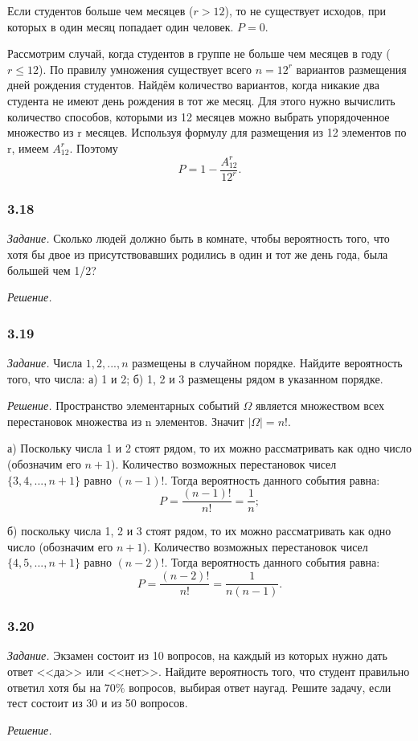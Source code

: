 \documentclass{book}
\begin{document}
Если студентов больше чем месяцев ($r>12$), то не существует исходов, при которых в один месяц попадает один человек. $P=0$.

Рассмотрим случай, когда студентов в группе не больше чем месяцев в году ($r\leq 12$). По правилу умножения существует всего $n=12^r$ вариантов размещения дней рождения студентов. Найдём количество вариантов, когда никакие два студента не имеют день рождения в тот же месяц. Для этого нужно вычислить количество способов, которыми из 12 месяцев можно выбрать упорядоченное множество из r месяцев. Используя формулу для размещения из 12 элементов по r, имеем $A_{12}^r$. Поэтому $$P=1-\frac{A_{12}^r}{12^r}.$$

\subsubsection*{3.18}

\textit{Задание.} Сколько людей должно быть в комнате, чтобы вероятность того, что хотя бы двое из присутствовавших родились в один и тот же день года, была большей чем 1/2?

\textit{Решение.}

\subsubsection*{3.19}

\textit{Задание.} Числа $1, 2, ..., n$ размещены в случайном порядке. Найдите вероятность того, что числа: а) 1 и 2; б) 1, 2 и 3 размещены рядом в указанном порядке.

\textit{Решение.} Пространство элементарных событий $\Omega$ является множеством всех перестановок множества из n элементов. Значит $|\Omega|=n!$.

а) Поскольку числа 1 и 2 стоят рядом, то их можно рассматривать как одно число (обозначим его $n+1$). Количество возможных перестановок чисел $\{3, 4, ..., n+1\}$ равно $\left(n-1\right)!$. Тогда вероятность данного события равна: $$P=\frac{\left(n-1\right)!}{n!}=\frac{1}{n};$$

б) поскольку числа 1, 2 и 3 стоят рядом, то их можно рассматривать как одно число (обозначим его $n+1$). Количество возможных перестановок чисел $\{4, 5, ..., n+1\}$ равно $\left(n-2\right)!$. Тогда вероятность данного события равна: $$P=\frac{\left(n-2\right)!}{n!}=\frac{1}{n(n-1)}.$$

\subsubsection*{3.20}

\textit{Задание.} Экзамен состоит из 10 вопросов, на каждый из которых нужно дать ответ <<да>> или <<нет>>. Найдите вероятность того, что студент правильно ответил хотя бы на $70\%$ вопросов, выбирая ответ наугад. Решите задачу, если тест состоит из 30 и из 50 вопросов.

\textit{Решение.}
\end{document}
